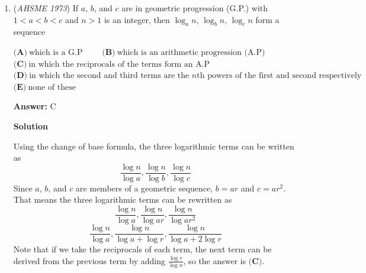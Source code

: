 \begin{enumerate}
Let $t$ be the total number of time in hours that Car B took to drive the distance.  This means that for have the time Car B traveled $\frac{ut}{2}$ miles and for half the time Car B traveled $\frac{vt}{2}$ miles.  That means the total distance traveled is $\frac{ut+vt}{2}$ miles, so
 \[y = \frac{\frac{ut+vt}{2}}{t}\]
 \[y = \frac{u+v}{2}\]Because both cars traveled the same distance, for half the distance Car A took $\frac{ut+vt}{4u}$ hours and for half the distance Car A took $\frac{ut+vt}{4v}$ hours.  That means
 \[x = \frac{\frac{ut+vt}{2}}{\frac{ut+vt}{4u} + \frac{ut+vt}{4v}}\]
 \[x = \frac{2}{\frac{1}{u} + \frac{1}{v}}\]In order to compare $x$ and $y$, we need to compare the values that $x$ and $y$ are equal to.
 \[\frac{2}{\frac{1}{u} + \frac{1}{v}} \bigcirc \frac{u+v}{2}\]Since the denominators of both numbers are positive, cross-multiplying won’t change the comparison sign.
 \[4 \bigcirc 2 + \frac{u}{v} + \frac{v}{u}\]
 \[2 \bigcirc  \frac{u}{v} + \frac{v}{u}\]Because $uv$ is positive, the comparison sign does not need to be changed either.
 \[2uv \bigcirc u^2 + v^2\]
 \[0 \bigcirc (u-v)^2\]By the \href{https://artofproblemsolving.com/wiki/index.php?title=Trivial\_Inequality}{Trivial Inequality}, $0 \le (u-v)^2$.  All of the steps are reversible, so $\boxed{\textbf{(A)}\ x \leq y}$.  This can be confirmed by testing values of $u$ and $v$.

 


	\item (\textit{AHSME 1973}) If $a$, $b$, and $c$ are in geometric progression (G.P.) with $1 < a < b < c$ and $n>1$ is an integer, then $\log_an$, $\log_bn$, $\log_cn$ form a sequence 


 $\textbf{(A)}\ \text{which is a G.P} \qquad$
$\textbf{(B)}\ \text{which is an arithmetic progression (A.P)} \qquad$
$\textbf{(C)}\ \text{in which the reciprocals of the terms form an A.P} \qquad$
$\textbf{(D)}\ \text{in which the second and third terms are the }n\text{th powers of the first and second respectively} \qquad$
$\textbf{(E)}\ \text{none of these}$

 \textbf{Answer: }C



\textbf{Solution}

Using the change of base formula, the three logarithmic terms can be written as
 \[\frac{\log n}{\log a},  \frac{\log n}{\log b}, \frac{\log n}{\log c}\]Since $a$, $b$, and $c$ are members of a geometric sequence, $b = ar$ and $c = ar^2$.  That means the three logarithmic terms can be rewritten as
 \[\frac{\log n}{\log a},  \frac{\log n}{\log ar}, \frac{\log n}{\log ar^2}\]
 \[\frac{\log n}{\log a},  \frac{\log n}{\log a + \log r}, \frac{\log n}{\log a + 2 \log r}\]Note that if we take the reciprocals of each term, the next term can be derived from the previous term by adding $\frac{\log r}{\log n}$, so the answer is $\boxed{\textbf{(C)}}$.


\end{enumerate}
